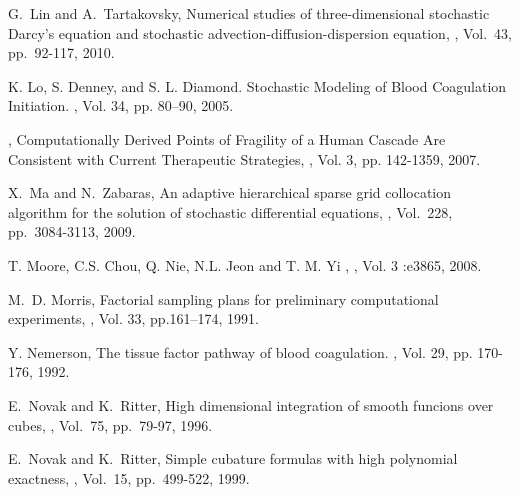 \begin{thebibliography}{99}
\newblock G.~Lin and A.~Tartakovsky, \newblock Numerical studies of three-dimensional stochastic
\newblock  Darcy's equation and stochastic advection-diffusion-dispersion
equation,
, Vol.~43, pp.~92-117, 2010.


K. Lo, S. Denney, and S. L. Diamond.
\newblock Stochastic Modeling of Blood Coagulation Initiation.
, Vol. 34, pp. 80--90, 2005.


, \newblock Computationally Derived
Points of Fragility of a Human Cascade Are Consistent with Current
Therapeutic Strategies, ,
Vol. 3, pp. 142-1359, 2007.


\newblock X.~Ma and N.~Zabaras, \newblock An adaptive hierarchical sparse grid collocation
\newblock  algorithm for the solution of stochastic differential equations, , Vol.~228, pp.~3084-3113, 2009.



T. Moore, C.S. Chou, Q. Nie,  N.L. Jeon and T. M. Yi , , Vol. 3 :e3865, 2008.

\newblock M.~D. Morris, \newblock Factorial sampling plans for preliminary computational
 \newblock experiments, , Vol. 33, pp.161--174, 1991.

Y. Nemerson,
\newblock The tissue factor pathway of blood coagulation.
, Vol. 29, pp. 170-176, 1992.

E.~Novak and K.~Ritter, \newblock High dimensional integration of
smooth funcions over cubes, , Vol.~75,
pp.~79-97, 1996.

E.~Novak and K.~Ritter, \newblock Simple cubature formulas with high
polynomial exactness, , Vol.~15,
pp.~499-522, 1999.


\end{thebibliography}
